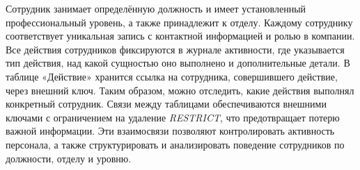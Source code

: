 Сотрудник занимает определённую должность и имеет установленный профессиональный уровень, а также принадлежит к отделу. Каждому сотруднику соответствует уникальная запись с контактной информацией и ролью в компании. Все действия сотрудников фиксируются в журнале активности, где указывается тип действия, над какой сущностью оно выполнено и дополнительные детали. В таблице «Действие» хранится ссылка на сотрудника, совершившего действие, через внешний ключ. Таким образом, можно отследить, какие действия выполнял конкретный сотрудник. Связи между таблицами обеспечиваются внешними ключами с ограничением на удаление \textit{RESTRICT}, что предотвращает потерю важной информации. Эти взаимосвязи позволяют контролировать активность персонала, а также структурировать и анализировать поведение сотрудников по должности, отделу и уровню.

